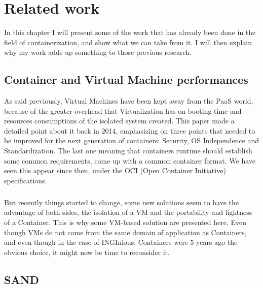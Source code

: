 \chapter{Related work}

In this chapter I will present some of the work that has already been done in the field of containerization, and show what we can take from it.  I will then explain why my work adds up something to those previous research.

\section{Container and Virtual Machine performances}
As said previously, Virtual Machines have been kept away from the PaaS world, because of the greater overhead that Virtualization has on booting time and resources consumptions of the isolated system created.  This paper \cite{dua2014virtualization} made a detailed point about it back in 2014, emphasizing on three points that needed to be improved for the next generation of containers: Security, OS Independence and Standardization.  The last one meaning that containers runtime should establish some common requirements, come up with a common container format.  We have seen this appear since then, under the OCI (Open Container Initiative) specifications.

\paragraph{}But recently things started to change, some new solutions seem to have the advantage of both sides, the isolation of a VM and the portability and lightness of a Container.  This is why some VM-based solution are presented here.  Even though VMs do not come from the same domain of application as Containers, and even though in the case of INGInious, Containers were 5 years ago the obvious choice, it might now be time to reconsider it.

\section{SAND} 
